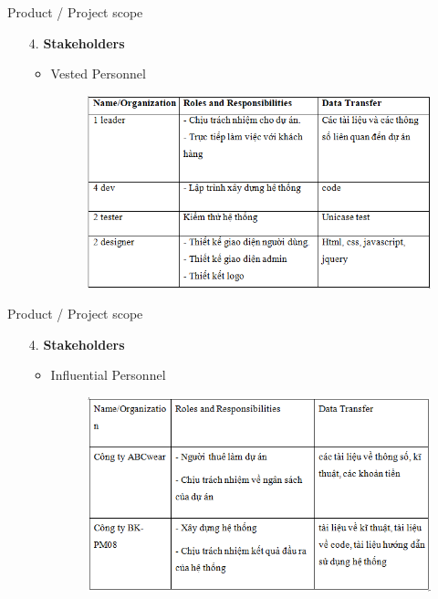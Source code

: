 \documentclass[compress]{beamer}
\begin{document}
\begin{frame}{Product / Project scope}
\begin{itemize}
\item[4. ] \textbf{Stakeholders}
\begin{itemize}
\item Vested Personnel
\begin{figure}[h]
\begin{center}
\includegraphics[scale=0.6]{QT.png}
\end{center}
\end{figure}
\end{itemize}
\end{itemize}
\end{frame}
\begin{frame}{Product / Project scope}
\begin{itemize}
\item[4. ] \textbf{Stakeholders}
\begin{itemize}
\item Influential Personnel
\begin{figure}[h]
\begin{center}
\includegraphics[scale=0.6]{QT1.png}
\end{center}
\end{figure}
\end{itemize}
\end{itemize}
\end{frame}
\end{document}
